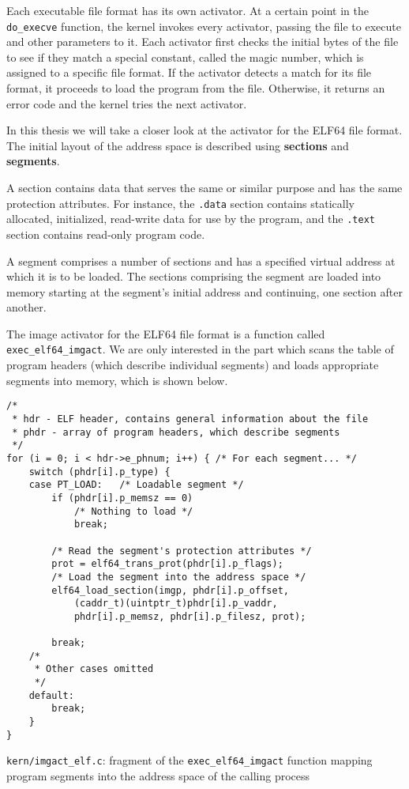 \documentclass[shortabstract, english]{iithesis}
\begin{document}
Each executable file format has its own activator. At a certain point in the
\texttt{do_execve} function, the kernel invokes every activator, passing
the file to execute and other parameters to it. Each activator first checks the
initial bytes of the file to see if they match a special constant, called the
magic number, which is assigned to a specific file format. If the activator
detects a match for its file format, it proceeds to load the program from the
file. Otherwise, it returns an error code and the kernel tries the next
activator.

In this thesis we will take a closer look at the activator for the ELF64 file
format. The initial layout of the address space is described using
\textbf{sections} and \textbf{segments}.

A section contains data that serves the same or similar purpose and has the same
protection attributes. For instance, the \texttt{.data} section contains
statically allocated, initialized, read-write data for use by the program, and
the \texttt{.text} section contains read-only program code.

A segment comprises a number of sections and has a specified virtual address at
which it is to be loaded. The sections comprising the segment are loaded into
memory starting at the segment's initial address and continuing, one section
after another.

The image activator for the ELF64 file format is a function called
\texttt{exec_elf64_imgact}. We are only interested in the part which
scans the table of program headers (which describe individual segments) and
loads appropriate segments into memory, which is shown below.

\begin{listing}[H]
\begin{verbatim}
/*
 * hdr - ELF header, contains general information about the file
 * phdr - array of program headers, which describe segments
 */
for (i = 0; i < hdr->e_phnum; i++) { /* For each segment... */
    switch (phdr[i].p_type) {
    case PT_LOAD:   /* Loadable segment */
        if (phdr[i].p_memsz == 0)
            /* Nothing to load */
            break;

        /* Read the segment's protection attributes */
        prot = elf64_trans_prot(phdr[i].p_flags);
        /* Load the segment into the address space */
        elf64_load_section(imgp, phdr[i].p_offset,
            (caddr_t)(uintptr_t)phdr[i].p_vaddr,
            phdr[i].p_memsz, phdr[i].p_filesz, prot);

        break;
    /*
     * Other cases omitted
     */
    default:
        break;
    }
}
\end{verbatim}
  \caption{\texttt{kern/imgact\_elf.c}: fragment of the
    \texttt{exec_elf64_imgact} function mapping program segments into the
    address space of the calling process}
\end{listing}
\end{document}
